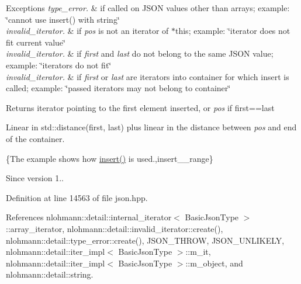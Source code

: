 \begin{DoxyExceptions}{Exceptions}
{\em type\+\_\+error.} & if called on J\+S\+ON values other than arrays; example\+: {\ttfamily \char`\"{}cannot use insert() with string\char`\"{}} \\
\hline
{\em invalid\+\_\+iterator.} & if {\itshape pos} is not an iterator of $\ast$this; example\+: {\ttfamily \char`\"{}iterator does not fit current value\char`\"{}} \\
\hline
{\em invalid\+\_\+iterator.} & if {\itshape first} and {\itshape last} do not belong to the same J\+S\+ON value; example\+: {\ttfamily \char`\"{}iterators do not fit\char`\"{}} \\
\hline
{\em invalid\+\_\+iterator.} & if {\itshape first} or {\itshape last} are iterators into container for which insert is called; example\+: {\ttfamily \char`\"{}passed iterators may not
belong to container\char`\"{}}\\
\hline
\end{DoxyExceptions}
\begin{DoxyReturn}{Returns}
iterator pointing to the first element inserted, or {\itshape pos} if {\ttfamily first==last}
\end{DoxyReturn}
Linear in {\ttfamily std\+::distance(first, last)} plus linear in the distance between {\itshape pos} and end of the container.

\{The example shows how {\ttfamily \hyperlink{classnlohmann_1_1basic__json_a0136728f5db69d4051c77b94307abd6c}{insert()}} is used.,insert\+\_\+\+\_\+range\}

\begin{DoxySince}{Since}
version 1.. 
\end{DoxySince}


Definition at line 14563 of file json.\+hpp.



References nlohmann\+::detail\+::internal\+\_\+iterator$<$ Basic\+Json\+Type $>$\+::array\+\_\+iterator, nlohmann\+::detail\+::invalid\+\_\+iterator\+::create(), nlohmann\+::detail\+::type\+\_\+error\+::create(), J\+S\+O\+N\+\_\+\+T\+H\+R\+OW, J\+S\+O\+N\+\_\+\+U\+N\+L\+I\+K\+E\+LY, nlohmann\+::detail\+::iter\+\_\+impl$<$ Basic\+Json\+Type $>$\+::m\+\_\+it, nlohmann\+::detail\+::iter\+\_\+impl$<$ Basic\+Json\+Type $>$\+::m\+\_\+object, and nlohmann\+::detail\+::string.


